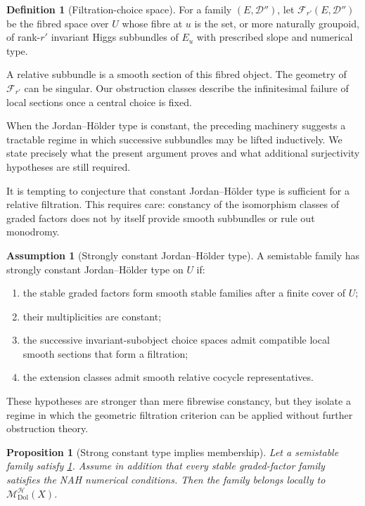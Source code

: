 \documentclass[11pt,reqno]{amsart}
\newtheorem{proposition}[theorem]{Proposition}
\theoremstyle{definition}
\newtheorem{definition}[theorem]{Definition}
\newtheorem{assumption}[theorem]{Assumption}
\theoremstyle{remark}
\newcommand{\cD}{\mathcal D}
\newcommand{\cH}{\mathcal H}
\newcommand{\Dol}{\mathrm{Dol}}
\newcommand{\MHDol}{\mathscr M^{\cH}_{\Dol}}
\begin{document}
\begin{definition}[Filtration-choice space]\label{def:filtration-choice-space}
For a family $(E,\cD'')$, let $\mathscr F_{r'}(E,\cD'')$ be the fibred space over $U$ whose fibre at $u$ is the set, or more naturally groupoid, of rank-$r'$ invariant Higgs subbundles of $E_u$ with prescribed slope and numerical type.
\end{definition}

A relative subbundle is a smooth section of this fibred object.  The geometry of $\mathscr F_{r'}$ can be singular.  Our obstruction classes describe the infinitesimal failure of local sections once a central choice is fixed.


When the Jordan--H\"older type is constant, the preceding machinery suggests a tractable regime in which successive subbundles may be lifted inductively.  We state precisely what the present argument proves and what additional surjectivity hypotheses are still required.


It is tempting to conjecture that constant Jordan--H\"older type is sufficient for a relative filtration.  This requires care: constancy of the isomorphism classes of graded factors does not by itself provide smooth subbundles or rule out monodromy.

\begin{assumption}[Strongly constant Jordan--H\"older type]\label{ass:strong-JH}
A semistable family has strongly constant Jordan--H\"older type on $U$ if:
\begin{enumerate}[label=(\roman*)]
\item the stable graded factors form smooth stable families after a finite cover of $U$;
\item their multiplicities are constant;
\item the successive invariant-subobject choice spaces admit compatible
local smooth sections that form a filtration;
\item the extension classes admit smooth relative cocycle representatives.
\end{enumerate}
\end{assumption}

These hypotheses are stronger than mere fibrewise constancy, but they isolate a regime in which the geometric filtration criterion can be applied without further obstruction theory.

\begin{proposition}[Strong constant type implies membership]\label{prop:strong-constant-membership}
Let a semistable family satisfy \cref{ass:strong-JH}.  Assume in addition that every stable graded-factor family satisfies the NAH numerical conditions.  Then the family belongs locally to $\MHDol(X)$.
\end{proposition}
\end{document}
